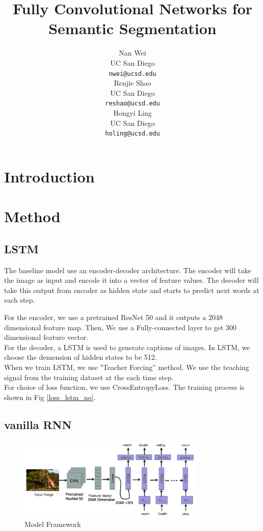\documentclass{article} %
\title{Fully Convolutional Networks for Semantic
Segmentation}
\author{
Nan Wei \\
UC San Diego\\
\texttt{nwei@ucsd.edu} \\
\And
Renjie Shao \\
UC San Diego \\
\texttt{reshao@ucsd.edu} \\
\And
Hongyi Ling \\
UC San Diego \\
\texttt{holing@ucsd.edu} \\
}
\begin{document}
\maketitle

\begin{abstract}

\end{abstract}

\section{Introduction}


\section{Method}
\subsection{LSTM}
The baseline model use an encoder-decoder architecture. 
The encoder will take the image as input and encode it into a vector of feature values.
 The decoder will take this output from encoder as hidden state and starts to predict next words at each step.

 For the encoder, we use a pretrained ResNet 50 and it outputs a  2048 dimensional feature map. Then, We use a Fully-connected layer to get 300 dimensional feature vector. \\
 For the decoder, a LSTM is used to generate captions of images. In LSTM, we choose the demension of hidden states to be 512. \\
 When we train LSTM, we use "Teacher Forcing” method. We use the teaching signal from the training dataset at the each time step.\\
 For choice of loss function, we use CrossEntropyLoss. The training process is shown in Fig \ref{loss_lstm_no}.
\subsection{vanilla RNN}

\begin{figure}[htb!]
    \centering
     \includegraphics[width=0.8\textwidth]{frame}
    \caption{Model Framework \cite{10.1007/978-3-030-04780-1_23}}
    \label{loss_fcn}
\end{figure}
\end{document}
